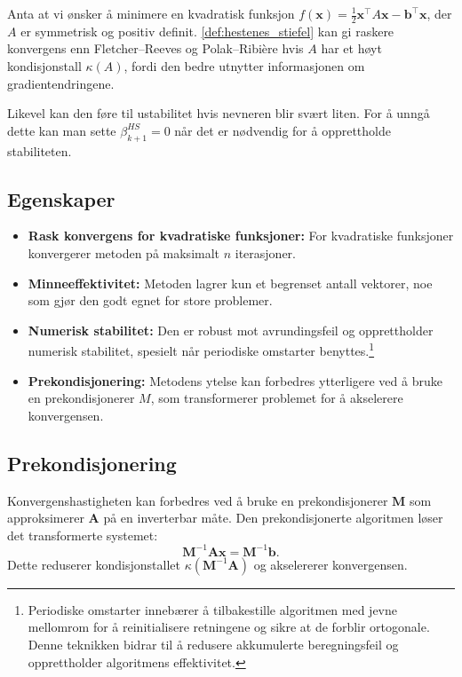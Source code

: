 \begin{example}{}{}
	Anta at vi ønsker å minimere en kvadratisk funksjon \(f(\symbf{x}) = \frac{1}{2}\symbf{x}^\top A\symbf{x} - \symbf{b}^\top \symbf{x}\), der \(A\) er symmetrisk og positiv definit.
	\ref{def:hestenes_stiefel} kan gi raskere konvergens enn Fletcher--Reeves og Polak--Ribière hvis \(A\) har et høyt kondisjonstall \(\kappa(A)\), fordi den bedre utnytter informasjonen om gradientendringene.
\end{example}

Likevel kan den føre til ustabilitet hvis nevneren blir svært liten.
For å unngå dette kan man sette \(\beta_{k+1}^{HS} = 0\) når det er nødvendig for å opprettholde stabiliteten.

\subsection{Egenskaper}
\begin{itemize}
	\item \textbf{Rask konvergens for kvadratiske funksjoner:}
	      For kvadratiske funksjoner konvergerer metoden på maksimalt \(n\) iterasjoner.
	\item \textbf{Minneeffektivitet:}
	      Metoden lagrer kun et begrenset antall vektorer, noe som gjør den godt egnet for store problemer.
	\item \textbf{Numerisk stabilitet:}
	      Den er robust mot avrundingsfeil og opprettholder numerisk stabilitet, spesielt når periodiske omstarter benyttes.\footnote{Periodiske omstarter innebærer å tilbakestille algoritmen med jevne mellomrom for å reinitialisere retningene og sikre at de forblir ortogonale. Denne teknikken bidrar til å redusere akkumulerte beregningsfeil og opprettholder algoritmens effektivitet.}
	\item \textbf{Prekondisjonering:}
	      Metodens ytelse kan forbedres ytterligere ved å bruke en prekondisjonerer \(M\), som transformerer problemet for å akselerere konvergensen.
\end{itemize}

\subsection{Prekondisjonering}
Konvergenshastigheten kan forbedres ved å bruke en prekondisjonerer \(\symbf{M}\) som approksimerer \(\symbf{A}\) på en inverterbar måte. Den prekondisjonerte algoritmen løser det transformerte systemet:
\[
	\symbf{M}^{-1}\symbf{A}\symbf{x} = \symbf{M}^{-1}\symbf{b}.
\]
Dette reduserer kondisjonstallet \(\kappa(\symbf{M}^{-1}\symbf{A})\) og akselererer konvergensen.

